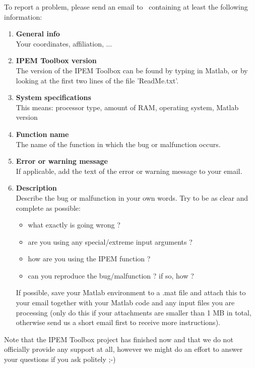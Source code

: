 To report a problem, please send an email to \IPEMMailSupport
~containing at least the following information:
\begin{enumerate}
    \item \textbf{General info}\\
    Your coordinates, affiliation, ...
    \item \textbf{IPEM Toolbox version}\\
    The version of the IPEM Toolbox can be found by typing  in
    Matlab, or by looking at the first two lines of the file 'ReadMe.txt'.
    \item \textbf{System specifications}\\
    This means: processor type, amount of RAM, operating system, Matlab version
    \item \textbf{Function name}\\
    The name of the function in which the bug or malfunction occurs.
    \item \textbf{Error or warning message}\\
    If applicable, add the text of the error or warning message to your email.
    \item \textbf{Description}\\
    Describe the bug or malfunction in your own words. Try to be as clear and
    complete as possible:
        \begin{itemize}
        \item what exactly is going wrong ?
        \item are you using any special/extreme input arguments ?
        \item how are you using the IPEM function ?
        \item can you reproduce the bug/malfunction ? if so, how ?
        \end{itemize}
    If possible, save your Matlab environment to a .mat file and
    attach this to your email together with your Matlab code and
    any input files you are processing (only do this if your
    attachments are smaller than 1 MB in total, otherwise send us
    a short email first to receive more instructions).
\end{enumerate}

Note that the IPEM Toolbox project has finished now and that we do
not officially provide any support at all, however we might do an
effort to answer your questions if you ask politely ;-)

